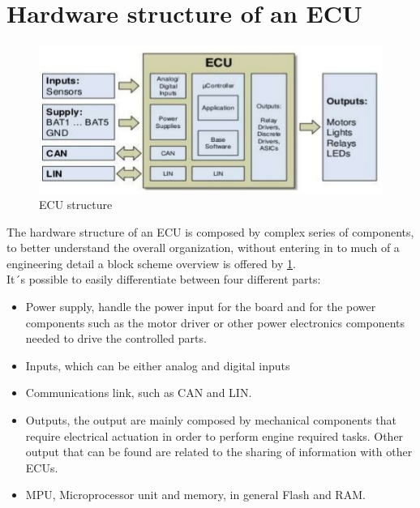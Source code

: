\documentclass[../main.tex]{subfiles}
\begin{document}
\section{Hardware structure of an ECU}
\begin{figure}[h]
    \centering
    \includegraphics[width=\linewidth]{images_folder/electronic-control-unitecu-6-638.jpg}
    \caption{ECU structure}
    \label{fig:ECUHW}
\end{figure}
The hardware structure of an ECU is composed by complex series of components, to better understand the overall organization, without entering in to much of a engineering detail a block scheme overview is offered by \ref{fig:ECUHW}.\\
It´s possible to easily differentiate between four different parts:
\begin{itemize}
    \item Power supply, handle the power input for the board and for the power components such as the motor driver or other power electronics components needed to drive the controlled parts. 
    \item Inputs, which can be either analog and digital inputs
    \item Communications link, such as CAN and LIN.
    \item Outputs, the output are mainly composed by mechanical components that require electrical actuation in order to perform engine required tasks. Other output that can be found are related to the sharing of information with other ECUs.
    \item MPU, Microprocessor unit and memory, in general Flash and RAM. 
\end{itemize}
\end{document}
